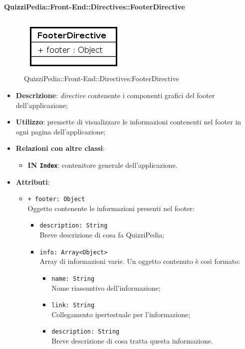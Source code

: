 \paragraph{QuizziPedia::Front-End::Directives::FooterDirective}
\begin{figure} [ht]
	\centering
	\includegraphics[scale=0.80]{UML/Classi/Front-End/QuizziPedia_Front-end_FooterDirective.png}
	\caption{QuizziPedia::Front-End::Directives:FooterDirective}
\end{figure} \FloatBarrier
\begin{itemize}
	\item \textbf{Descrizione}: \textit{directive} contenente i componenti grafici del footer dell'applicazione;
	\item \textbf{Utilizzo}: premette di visualizzare le informazioni contenenti nel footer in ogni pagina dell'applicazione;
	\item \textbf{Relazioni con altre classi}:
	\begin{itemize}
		\item \textbf{IN \texttt{Index}}: contenitore generale dell'applicazione.
	\end{itemize}
	\item \textbf{Attributi}:
	\begin{itemize}
		\item \texttt{+ footer: Object} \\ Oggetto contenente le informazioni presenti nel footer:
		\begin{itemize}
			\item \texttt{description: String} \\
			Breve descrizione di cosa fa QuizziPedia;
			\item \texttt{info: Array<Object>} \\
			Array di informazioni varie. Un oggetto contenuto è così formato:
			\begin{itemize}
				\item \texttt{name: String} \\
				Nome riassuntivo dell'informazione;
				\item \texttt{link: String} \\
				Collegamento ipertestuale per l'informazione;
				\item \texttt{description: String} \\
				Breve descrizione di cosa tratta questa informazione.			
			\end{itemize} 
		\end{itemize}
	\end{itemize}
\end{itemize}